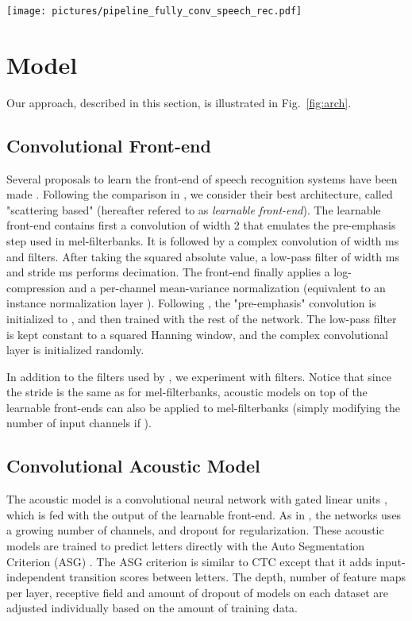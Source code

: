 \documentclass[a4paper]{article}
\begin{document}
\begin{figure*}
\texttt{[image: pictures/pipeline\_fully\_conv\_speech\_rec.pdf]}
\caption{Overview of the fully convolutional architecture.}
\label{fig:arch}
\end{figure*}
\section{Model}

Our approach, described in this section, is illustrated in Fig.~\ref{fig:arch}.

\label{sec:model}
\subsection{Convolutional Front-end}

Several proposals to learn the front-end of speech recognition systems have been made \cite{hoshen2015speech,sainath2015learning,tdfbanks1,tdfbanks2}. Following the comparison in \cite{tdfbanks2}, we consider their best architecture, called "scattering based" (hereafter refered to as \emph{learnable front-end}). The learnable front-end contains first a convolution of width 2 that emulates the pre-emphasis step used in mel-filterbanks. It is followed by a complex convolution of width ms and  filters. After taking the squared absolute value, a low-pass filter of width ms and stride ms performs de\-ci\-ma\-tion. The front-end finally applies a log-compression and a per-channel mean-variance normalization (equivalent to an instance normalization layer \cite{ulyanov2017instance}). Following \cite{tdfbanks2}, the "pre-emphasis" convolution is initialized to , and then trained with the rest of the network. The low-pass filter is kept constant to a squared Hanning window, and the complex convolutional layer is initialized randomly. 

In addition to the  filters used by \cite{tdfbanks2}, we experiment with  filters. Notice that since the stride is the same as for mel-filterbanks, acoustic models on top of the learnable front-ends can also be applied to mel-filterbanks (simply modifying the number of input channels if ).

\subsection{Convolutional Acoustic Model}
The acoustic model is a convolutional neural network with gated linear units \cite{glu}, which is fed with the output of the learnable front-end. As in \cite{wav2letter2}, the networks uses a growing number of channels, and dropout \cite{dropout} for regula\-rization. These acoustic models are trained to predict letters directly with the Auto Segmentation Criterion (ASG) \cite{wav2letter}. 
The ASG criterion is similar to CTC \cite{CTC} except that it adds input-independent transition scores between letters.
The depth, number of feature maps per layer, receptive field and amount of dropout of models on each dataset are adjusted individually based on the amount of training data.
\end{document}
